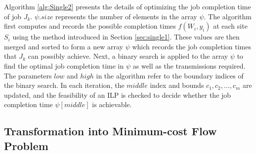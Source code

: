 Algorithm \ref{alg:Single2} presents the details of optimizing the job completion time of job $J_k$. $\psi.size$ represents the number of elements in the array $\psi$. The algorithm first computes and records the possible completion times $f(W_i, y_i)$ at each site $S_i$ using the method introduced in Section \ref{sec:single1}. These values are then merged and sorted to form a new array $\psi$ which records the job completion times that $J_k$ can possibly achieve. Next, a binary search is applied to the array $\psi$ to find the optimal job completion time in $\psi$ as well as the transmissions required. The parameters $low$ and $high$ in the algorithm refer to the boundary indices of the binary search. In each iteration, the $middle$ index and bounds $c_1, c_2, \dots, c_m$ are updated, and the feasibility of an ILP is checked to decide whether the job completion time $\psi[middle]$ is achievable.

\subsection{Transformation into Minimum-cost Flow Problem}
\label{sec:flow}


